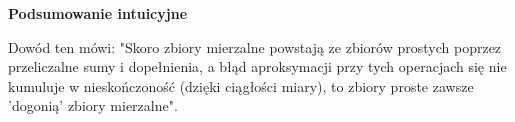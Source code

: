 \textbf{Podsumowanie intuicyjne}

Dowód ten mówi: "Skoro zbiory mierzalne powstają ze zbiorów prostych poprzez przeliczalne sumy i dopełnienia, a błąd aproksymacji przy tych operacjach się nie kumuluje w nieskończoność (dzięki ciągłości miary), to zbiory proste zawsze 'dogonią' zbiory mierzalne".


